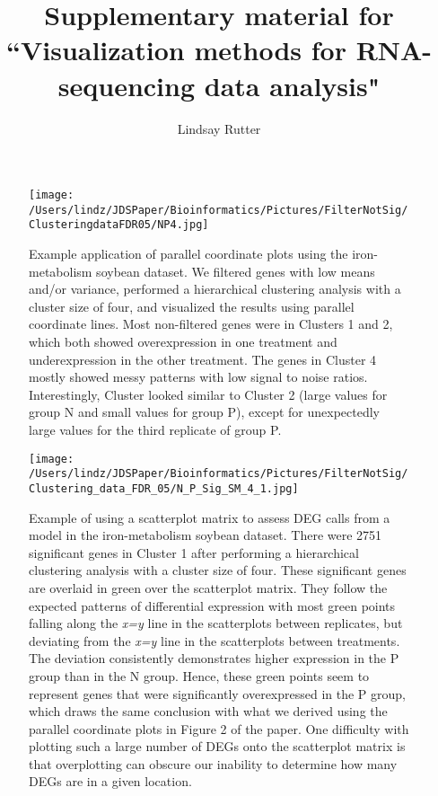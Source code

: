 \documentclass{article}
\begin{document}
\title{Supplementary material for ``Visualization methods for RNA-sequencing data analysis"}
\author{Lindsay Rutter}

\maketitle

\begin{figure}[!p]
\centerline{\texttt{[image: /Users/lindz/JDSPaper/Bioinformatics/Pictures/FilterNotSig/ClusteringdataFDR05/NP4.jpg]}}
\caption{Example application of parallel coordinate plots using the iron-metabolism soybean dataset. We filtered genes with low means and/or variance, performed a hierarchical clustering analysis with a cluster size of four, and visualized the results using parallel coordinate lines. Most non-filtered genes were in Clusters 1 and 2, which both showed overexpression in one treatment and underexpression in the other treatment. The genes in Cluster 4 mostly showed messy patterns with low signal to noise ratios. Interestingly, Cluster looked similar to Cluster 2 (large values for group N and small values for group P), except for unexpectedly large values for the third replicate of group P.
\label{suppNonSigCluster}}
\end{figure}

\begin{figure}[!p]
\centerline{\texttt{[image: /Users/lindz/JDSPaper/Bioinformatics/Pictures/FilterNotSig/Clustering\_data\_FDR\_05/N\_P\_Sig\_SM\_4\_1.jpg]}}
\caption{Example of using a scatterplot matrix to assess DEG calls from a model in the iron-metabolism soybean dataset. There were 2751 significant genes in Cluster 1 after performing a hierarchical clustering analysis with a cluster size of four. These significant genes are overlaid in green over the scatterplot matrix. They follow the expected patterns of differential expression with most green points falling along the \textit{x=y} line in the scatterplots between replicates, but deviating from the \textit{x=y} line in the scatterplots between treatments. The deviation consistently demonstrates higher expression in the P group than in the N group. Hence, these green points seem to represent genes that were significantly overexpressed in the P group, which draws the same conclusion with what we derived using the parallel coordinate plots in Figure 2 of the paper. One difficulty with plotting such a large number of DEGs onto the scatterplot matrix is that overplotting can obscure our inability to determine how many DEGs are in a given location.
\label{suppSMCluster1}}
\end{figure}
\end{document}
